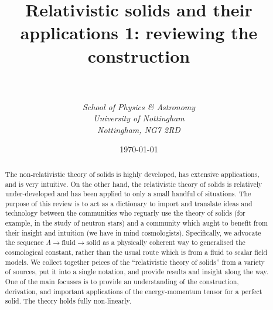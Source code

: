 \documentclass[a4paper, 12pt]{article}
\numberwithin{equation}{section}
\begin{document}
\title{\sc Relativistic solids and their applications 1: reviewing the construction}
\author{\\ \\ \it{School of Physics \& Astronomy} \\ \it{University of Nottingham} \\ \it{Nottingham, NG7 2RD} }

\date{\today}



\maketitle
\begin{abstract}
The non-relativistic theory of solids is  highly developed, has extensive applications, and is very intuitive. On the other hand, the relativistic theory of solids is relatively under-developed and has been applied to only a small handful of situations. The purpose of this review is to act as a dictionary to import and translate   ideas and technology between the communities who reguarly use the theory of solids (for example, in the study of neutron stars) and a community which aught to benefit from their insight and intuition (we have in mind cosmologists). Specifically, we advocate the sequence $\Lambda \rightarrow \mbox{fluid} \rightarrow \mbox{solid}$ as a physically coherent way to generalised the cosmological constant, rather than the usual route which is from a fluid to scalar field models. We collect together peices of the ``relativistic theory of solids'' from a variety of sources, put it into a single notation, and provide results and insight along the way. One of the main focusses is to provide an understanding of the construction, derivation, and important applications of the energy-momentum tensor for a perfect solid. The theory holds fully non-linearly.
\end{abstract}
\clearpage
\tableofcontents

\clearpage
{}


\end{document}
